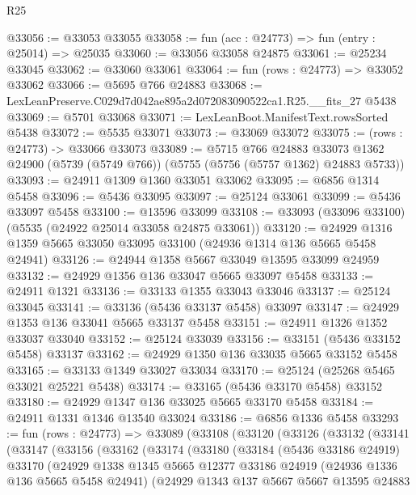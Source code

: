 \begin{lexlean}{R25}
\begin{coremodule}
@33056 := @33053 @33055
@33058 := fun (acc : @24773) => fun (entry : @25014) => @25035
@33060 := @33056 @33058 @24875
@33061 := @25234 @33045
@33062 := @33060 @33061
@33064 := fun (rows : @24773) => @33052 @33062
@33066 := @5695 @766 @24883
@33068 := LexLeanPreserve.C029d7d042ae895a2d072083090522ca1.R25.__fits_27 @5438
@33069 := @5701 @33068
@33071 := LexLeanBoot.ManifestText.rowsSorted @5438
@33072 := @5535 @33071
@33073 := @33069 @33072
@33075 := (rows : @24773) -> @33066 @33073
@33089 := @5715
    @766
    @24883
    @33073
    @1362
    @24900
    (@5739 (@5749 @766))
    (@5755 (@5756 (@5757 @1362) @24883 @5733))
@33093 := @24911 @1309 @1360 @33051 @33062
@33095 := @6856 @1314 @5458
@33096 := @5436 @33095
@33097 := @25124 @33061
@33099 := @5436 @33097 @5458
@33100 := @13596 @33099
@33108 := @33093 (@33096 @33100) (@5535 (@24922 @25014 @33058 @24875 @33061))
@33120 := @24929 @1316 @1359 @5665 @33050 @33095 @33100 (@24936 @1314 @136 @5665 @5458 @24941)
@33126 := @24944 @1358 @5667 @33049 @13595 @33099 @24959
@33132 := @24929 @1356 @136 @33047 @5665 @33097 @5458
@33133 := @24911 @1321
@33136 := @33133 @1355 @33043 @33046
@33137 := @25124 @33045
@33141 := @33136 (@5436 @33137 @5458) @33097
@33147 := @24929 @1353 @136 @33041 @5665 @33137 @5458
@33151 := @24911 @1326 @1352 @33037 @33040
@33152 := @25124 @33039
@33156 := @33151 (@5436 @33152 @5458) @33137
@33162 := @24929 @1350 @136 @33035 @5665 @33152 @5458
@33165 := @33133 @1349 @33027 @33034
@33170 := @25124 (@25268 @5465 @33021 @25221 @5438)
@33174 := @33165 (@5436 @33170 @5458) @33152
@33180 := @24929 @1347 @136 @33025 @5665 @33170 @5458
@33184 := @24911 @1331 @1346 @13540 @33024
@33186 := @6856 @1336 @5458
@33293 := fun (rows : @24773) =>
  @33089
    (@33108
      (@33120
        (@33126
          (@33132
            (@33141
              (@33147
                (@33156
                  (@33162
                    (@33174
                      (@33180
                        (@33184
                          (@5436 @33186 @24919)
                          @33170
                          (@24929
                            @1338
                            @1345
                            @5665
                            @12377
                            @33186
                            @24919
                            (@24936 @1336 @136 @5665 @5458 @24941)
                            (@24929
                              @1343
                              @137
                              @5667
                              @5667
                              @13595
                              @24883

\end{coremodule}
\end{lexlean}
